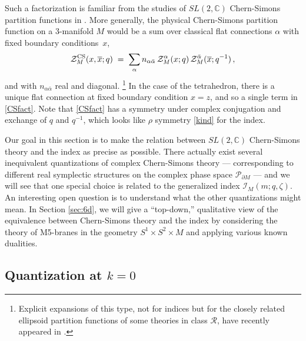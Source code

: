 \documentclass[11pt,letterpaper]{article}
\numberwithin{equation}{section}
\newcommand{\be}{\begin{equation}}
\newcommand{\ee}{\end{equation}}
\newcommand{\ol}{\overline}
\newcommand{\C}{{\mathbb C}}
\newcommand{\pd}{\partial}
\newcommand{\CI}{\mathcal{I}}
\newcommand{\CP}{\mathcal{P}}
\newcommand{\CR}{\mathcal{R}}
\newcommand{\CZ}{\mathcal{Z}}
\begin{document}
Such a factorization is familiar from the studies of $SL(2,\C)$ Chern-Simons partition functions in \cite{gukov-2003, DGLZ, Wit-anal}. More generally, the physical Chern-Simons partition function on a 3-manifold $M$ would be a sum over classical flat connections $\alpha$ with fixed boundary conditions~$x$,
%
\be \CZ^{\rm CS}_M(x,\ol x;q)\; = \; \sum_{\alpha}n_{\alpha\bar\alpha}\,\CZ_M^\alpha(x;q)\,\CZ_M^{\bar \alpha}(\ol x;q^{-1})\,, \label{CSfact} \ee
%
and with $n_{\alpha\bar\alpha}$ real and diagonal.%
%
\footnote{Explicit expansions of this type, not for indices but for the closely related ellipsoid partition functions of some theories in class $\CR$, have recently appeared in \cite{Pasquetti-fact}.}
In the case of the tetrahedron, there is a unique flat connection at fixed boundary condition $x=z$, and so a single term in \eqref{CSfact}.
Note that \eqref{CSfact} has a symmetry under complex conjugation and exchange of $q$ and $q^{-1}$, which looks like $\rho$ symmetry \eqref{kind} for the index.



Our goal in this section is to make the relation between $SL(2,\C)$ Chern-Simons theory and the index as precise as possible. There actually exist several inequivalent quantizations of complex Chern-Simons theory --- corresponding to different real symplectic structures on the complex phase space $\CP_{\pd M}$ --- and we will see that one special choice is related to the generalized index $\CI_M(m;q,\zeta)$. An interesting open question is to understand what the other quantizations might mean. In Section \ref{sec:6d}, we will give a ``top-down,'' qualitative view of the equivalence between Chern-Simons theory and the index by considering the theory of M5-branes in the geometry $S^1\times S^2\times M$ and applying various known dualities.


\subsection{Quantization at $k=0$}
\label{sec:k0}
\end{document}
